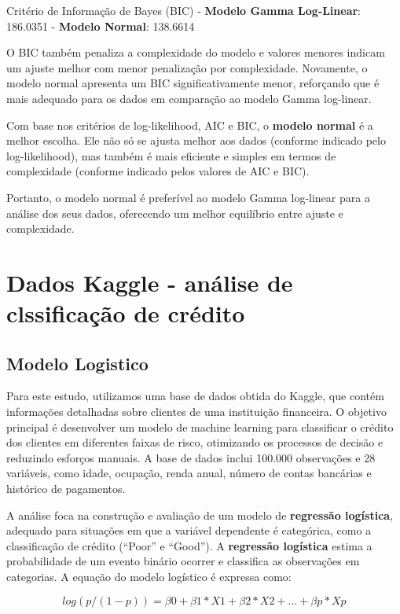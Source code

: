 \documentclass[
  letterpaper,
  DIV=11,
  numbers=noendperiod]{scrreprt}
\begin{document}
Critério de Informação de Bayes (BIC) - \textbf{Modelo Gamma
Log-Linear}: 186.0351 - \textbf{Modelo Normal}: 138.6614

O BIC também penaliza a complexidade do modelo e valores menores indicam
um ajuste melhor com menor penalização por complexidade. Novamente, o
modelo normal apresenta um BIC significativamente menor, reforçando que
é mais adequado para os dados em comparação ao modelo Gamma log-linear.

Com base nos critérios de log-likelihood, AIC e BIC, o \textbf{modelo
normal} é a melhor escolha. Ele não só se ajusta melhor aos dados
(conforme indicado pelo log-likelihood), mas também é mais eficiente e
simples em termos de complexidade (conforme indicado pelos valores de
AIC e BIC).

Portanto, o modelo normal é preferível ao modelo Gamma log-linear para a
análise dos seus dados, oferecendo um melhor equilíbrio entre ajuste e
complexidade.

\chapter{Dados Kaggle - análise de clssificação de
crédito}\label{dados-kaggle---anuxe1lise-de-clssificauxe7uxe3o-de-cruxe9dito}

\section{Modelo Logistico}\label{modelo-logistico}

Para este estudo, utilizamos uma base de dados obtida do Kaggle, que
contém informações detalhadas sobre clientes de uma instituição
financeira. O objetivo principal é desenvolver um modelo de machine
learning para classificar o crédito dos clientes em diferentes faixas de
risco, otimizando os processos de decisão e reduzindo esforços manuais.
A base de dados inclui 100.000 observações e 28 variáveis, como idade,
ocupação, renda anual, número de contas bancárias e histórico de
pagamentos.

A análise foca na construção e avaliação de um modelo de
\textbf{regressão logística}, adequado para situações em que a variável
dependente é categórica, como a classificação de crédito (``Poor'' e
``Good''). A \textbf{regressão logística} estima a probabilidade de um
evento binário ocorrer e classifica as observações em categorias. A
equação do modelo logístico é expressa como:

\[log(p / (1 - p)) = β0 + β1 * X1 + β2 * X2 + ... + βp * Xp\]
\end{document}
